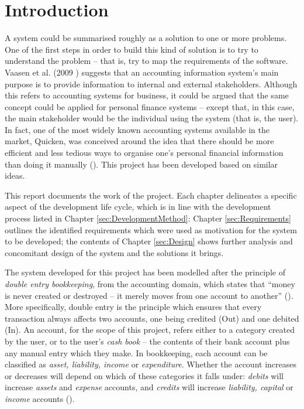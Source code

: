 \section{Introduction} \label{sec:Introduction}

A system could be summarised roughly as a solution to one or more problems. One
of the first steps in order to build this kind of solution is to try to
understand the problem -- that is, try to map the requirements of the software.
Vaasen et al. (2009 \cite[cited][p.~8]{Boczko:2012:IAI:2331376}) suggests that
an accounting information system's main purpose is to provide information to
internal and external stakeholders. Although this refers to accounting systems
for business, it could be argued that the same concept could be applied for
personal finance systems -- except that, in this case, the main stakeholder
would be the individual using the system (that is, the user). In fact, one of
the most widely known accounting systems available in the market,
Quicken\texttrademark, was conceived around the idea that there should be more
efficient and less tedious ways to organise one's personal financial
information than doing it manually (\cite{quicken2017about}). This project has
been developed based on similar ideas.

This report documents the work of the project. Each chapter delineates a
specific aspect of the development life cycle, which is in line with the
development process listed in Chapter \ref{sec:DevelopmentMethod}: Chapter
\ref{sec:Requirements} outlines the identified requirements which were used as
motivation for the system to be developed; the contents of Chapter
\ref{sec:Design} shows further analysis and concomitant design of the system
and the solutions it brings.

The system developed for this project has been modelled after the principle of
\emph{double entry bookkeeping}, from the accounting domain, which states that
``money is never created or destroyed -- it merely moves from one account to
another'' (\cite[][Section 6.2]{fowler1997analysis}). More specifically, double
entry is the principle which ensures that every transaction always affects two
accounts, one being credited (Out) and one debited (In). An account, for the
scope of this project, refers either to a category created by the user, or to
the user's \emph{cash book} -- the contents of their bank account plus any
manual entry which they make. In bookkeeping, each account can be classified as
\emph{asset, liability, income} or \emph{expenditure}. Whether the account
increases or decreases will depend on which of these categories it falls under:
\emph{debits} will increase \emph{assets} and \emph{expense} accounts, and
\emph{credits} will increase \emph{liability, capital} or \emph{income}
accounts (\cite[][pp.~18-19]{wood2004book}).
